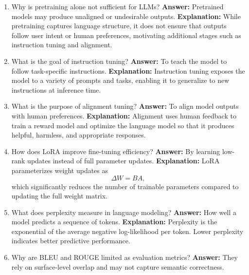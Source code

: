\documentclass{article}
\begin{document}
\begin{enumerate}
\item Why is pretraining alone not sufficient for LLMs?\newline
\textbf{Answer:} Pretrained models may produce unaligned or undesirable outputs.\newline
\textbf{Explanation:} While pretraining captures language structure, it does not ensure that outputs follow user intent or human preferences, motivating additional stages such as instruction tuning and alignment.

\item What is the goal of instruction tuning?\newline
\textbf{Answer:} To teach the model to follow task-specific instructions.\newline
\textbf{Explanation:} Instruction tuning exposes the model to a variety of prompts and tasks, enabling it to generalize to new instructions at inference time.

\item What is the purpose of alignment tuning?\newline
\textbf{Answer:} To align model outputs with human preferences.\newline
\textbf{Explanation:} Alignment uses human feedback to train a reward model and optimize the language model so that it produces helpful, harmless, and appropriate responses.

\item How does LoRA improve fine-tuning efficiency?\newline
\textbf{Answer:} By learning low-rank updates instead of full parameter updates.\newline
\textbf{Explanation:} LoRA parameterizes weight updates as
\[
\Delta W = BA,
\]
which significantly reduces the number of trainable parameters compared to updating the full weight matrix.

\item What does perplexity measure in language modeling?\newline
\textbf{Answer:} How well a model predicts a sequence of tokens.\newline
\textbf{Explanation:} Perplexity is the exponential of the average negative log-likelihood per token. Lower perplexity indicates better predictive performance.

\item Why are BLEU and ROUGE limited as evaluation metrics?\newline
\textbf{Answer:} They rely on surface-level overlap and may not capture semantic correctness.


\end{enumerate}
\end{document}
